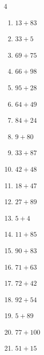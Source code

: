 \begin{multicols}{4}
\begin{enumerate}
  \item $13+83$
        \phantom{$=96$}

  \item $33+5$
        \phantom{$=38$}

  \item $69+75$
        \phantom{$=144$}

  \item $66+98$
        \phantom{$=164$}

  \item $95+28$
        \phantom{$=123$}

  \item $64+49$
        \phantom{$=113$}

  \item $84+24$
        \phantom{$=108$}

  \item $9+80$
        \phantom{$=89$}

  \item $33+87$
        \phantom{$=120$}

\columnbreak %

  \item $42+48$
        \phantom{$=90$}

  \item $18+47$
        \phantom{$=65$}

  \item $27+89$
        \phantom{$=116$}

  \item $5+4$
        \phantom{$=9$}

  \item $11+85$
        \phantom{$=96$}

  \item $90+83$
        \phantom{$=173$}

  \item $71+63$
        \phantom{$=134$}

  \item $72+42$
        \phantom{$=114$}

  \item $92+54$
        \phantom{$=146$}

  \item $5+89$
        \phantom{$=94$}

  \item $77+100$
        \phantom{$=177$}

  \item $51+15$
        \phantom{$=66$}


\end{enumerate}
\end{multicols}
